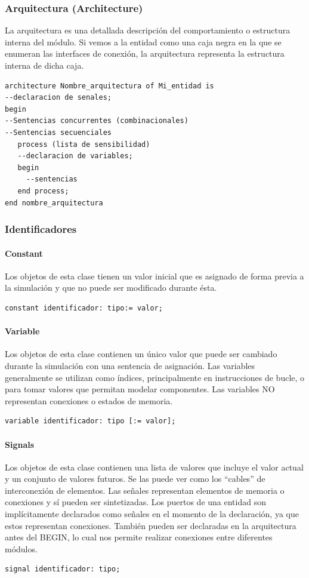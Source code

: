 \subsubsection{Arquitectura (Architecture)}
La arquitectura es una detallada descripción del comportamiento o estructura interna del módulo. Si vemos a la entidad como una caja 
negra en la que se enumeran las interfaces de conexión, la arquitectura representa la estructura interna de dicha caja.

\begin{lstlisting}[style=vhdl]
architecture Nombre_arquitectura of Mi_entidad is
--declaracion de senales;
begin
--Sentencias concurrentes (combinacionales)
--Sentencias secuenciales
   process (lista de sensibilidad)
   --declaracion de variables;
   begin
     --sentencias
   end process;
end nombre_arquitectura
\end{lstlisting}

\subsubsection{Identificadores}

\paragraph{Constant}
Los objetos de esta clase tienen un valor inicial que es asignado de
forma previa a la simulación y que no puede ser modificado durante ésta.
\begin{lstlisting}[style=vhdl]
 constant identificador: tipo:= valor;
\end{lstlisting}

\paragraph{Variable}
Los objetos de esta clase contienen un único valor que puede ser
cambiado durante la simulación con una sentencia de asignación. Las variables
generalmente se utilizan como índices, principalmente en instrucciones de bucle, o
para tomar valores que permitan modelar componentes. Las variables NO
representan conexiones o estados de memoria.
\begin{lstlisting}[style=vhdl]
 variable identificador: tipo [:= valor];
\end{lstlisting}

\paragraph{Signals}
Los objetos de esta clase contienen una lista de valores que incluye el
valor actual y un conjunto de valores futuros. Se las puede ver como los
``cables'' de interconexión de elementos. Las señales representan elementos de
memoria o conexiones y sí pueden ser sintetizadas. Los puertos de una entidad son
implícitamente declarados como señales en el momento de la declaración, ya que
estos representan conexiones. También pueden ser declaradas en la arquitectura
antes del BEGIN, lo cual nos permite realizar conexiones entre diferentes módulos.
\begin{lstlisting}[style=vhdl]
 signal identificador: tipo;
\end{lstlisting}

